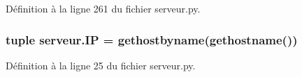 Définition à la ligne 261 du fichier serveur.\-py.

\hypertarget{namespaceserveur_adc80b043dfed2687ba0a7312af3e9745}{
\subsubsection[{I\-P}]{\setlength{\rightskip}{0pt plus 5cm}tuple serveur.\-I\-P = gethostbyname(gethostname())}}\label{namespaceserveur_adc80b043dfed2687ba0a7312af3e9745}


Définition à la ligne 25 du fichier serveur.\-py.

